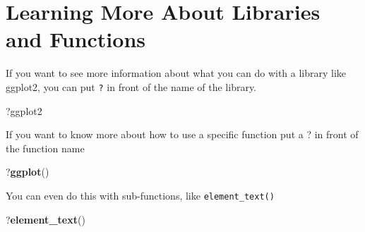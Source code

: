 \documentclass[
]{book}
\newenvironment{Shaded}{\begin{snugshade}}{\end{snugshade}}
\newcommand{\KeywordTok}[1]{\textcolor[rgb]{0.13,0.29,0.53}{\textbf{#1}}}
\newcommand{\NormalTok}[1]{#1}
\begin{document}
\hypertarget{learning-more-about-libraries-and-functions}{%
\section{Learning More About Libraries and Functions}\label{learning-more-about-libraries-and-functions}}

If you want to see more information about what you can do with a library like
ggplot2, you can put \texttt{?} in front of the name of the library.

\begin{Shaded}
\begin{Highlighting}[]
\NormalTok{?ggplot2}
\end{Highlighting}
\end{Shaded}

If you want to know more about how to use a specific function
put a ? in front of the function name

\begin{Shaded}
\begin{Highlighting}[]
\NormalTok{?}\KeywordTok{ggplot}\NormalTok{()}
\end{Highlighting}
\end{Shaded}

You can even do this with sub-functions, like \texttt{element\_text()}

\begin{Shaded}
\begin{Highlighting}[]
\NormalTok{?}\KeywordTok{element\_text}\NormalTok{()}
\end{Highlighting}
\end{Shaded}


\backmatter
  
\end{document}
